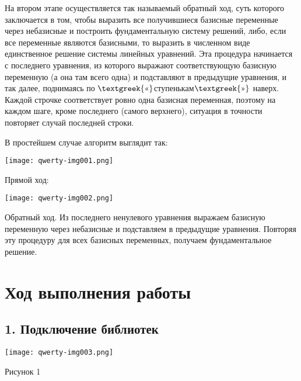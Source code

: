 \documentclass{article}
\begin{document}
На втором этапе осуществляется так называемый обратный ход, суть которого заключается в том, чтобы выразить все
получившиеся базисные переменные через небазисные и построить фундаментальную систему решений, либо, если все
переменные являются базисными, то выразить в численном виде единственное решение системы линейных уравнений. Эта
процедура начинается с последнего уравнения, из которого выражают соответствующую базисную переменную (а она там всего
одна) и подставляют в предыдущие уравнения, и так далее, поднимаясь по
$\text{\textgreek{«}}$ступенькам$\text{\textgreek{»}}$ наверх. Каждой строчке соответствует ровно одна базисная
переменная, поэтому на каждом шаге, кроме последнего (самого верхнего), ситуация в точности повторяет случай последней
строки.

В простейшем случае алгоритм выглядит так:

 \texttt{[image: qwerty-img001.png]} 

Прямой ход:

 \texttt{[image: qwerty-img002.png]} 

Обратный ход. Из последнего ненулевого уравнения выражаем базисную переменную через небазисные и подставляем в
предыдущие уравнения. Повторяя эту процедуру для всех базисных переменных, получаем фундаментальное решение.


\bigskip

\clearpage\section{Ход выполнения работы}
\subsection{1. Подключение библиотек}
 \texttt{[image: qwerty-img003.png]} 

Рисунок 1
\end{document}
